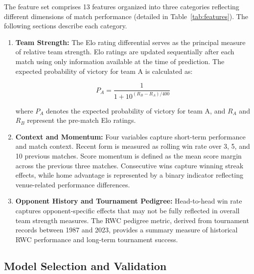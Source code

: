 \documentclass[12pt,a4paper,onecolumn]{article}
\begin{document}
The feature set comprises 13 features organized into three categories reflecting different dimensions of match performance (detailed in Table~\ref{tab:features}). The following sections describe each category.

\vspace{0.25cm}

\begin{enumerate}[label=\textbf{\arabic*.}, leftmargin=1.5cm, itemsep=0.5em, parsep=0.5em]

\item \textbf{Team Strength:} The Elo rating differential serves as the principal measure of relative team strength. \cite{Elo1978} Elo ratings are updated sequentially after each match using only information available at the time of prediction. The expected probability of victory for team A is calculated as:

\begin{equation}
P_A = \frac{1}{1 + 10^{(R_B-R_A)/400}}
\label{eq:elo}
\end{equation}

where $P_A$ denotes the expected probability of victory for team A, and $R_A$ and $R_B$ represent the pre-match Elo ratings. \cite{Elo1978}

\item \textbf{Context and Momentum:} Four variables capture short-term performance and match context. Recent form is measured as rolling win rate over 3, 5, and 10 previous matches. Score momentum is defined as the mean score margin across the previous three matches. Consecutive wins capture winning streak effects, while home advantage is represented by a binary indicator reflecting venue-related performance differences. \cite{Thomas2008,Nevill1999}

\item \textbf{Opponent History and Tournament Pedigree:} Head-to-head win rate captures opponent-specific effects that may not be fully reflected in overall team strength measures. \cite{BunkerThabtah2019} The RWC pedigree metric, derived from tournament records between 1987 and 2023, provides a summary measure of historical RWC performance and long-term tournament success.

\end{enumerate}

\subsection{Model Selection and Validation}
\end{document}
